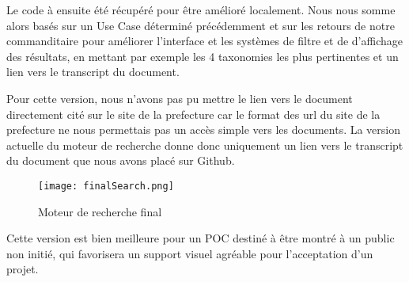 Le code à ensuite été récupéré pour être amélioré localement.
Nous nous somme alors basés sur un Use Case déterminé précédemment et sur les retours de notre commanditaire pour améliorer l'interface et les systèmes de filtre et de d'affichage des résultats, en mettant par exemple les 4 taxonomies les plus pertinentes et un lien vers le transcript du document.

Pour cette version, nous n'avons pas pu mettre le lien vers le document directement cité sur le site de la prefecture car le format des url du site de la prefecture ne nous permettais pas un accès simple vers les documents.
La version actuelle du moteur de recherche donne donc uniquement un lien vers le transcript du document que nous avons placé sur Github.


\begin{figure}[h!]
  \centering
  \texttt{[image: finalSearch.png]}
	\caption[]{Moteur de recherche final}
	\label{fig:finalSearch}
\end{figure}

Cette version est bien meilleure pour un POC destiné à être montré à un public non initié, qui favorisera un support visuel agréable pour l'acceptation d'un projet.










